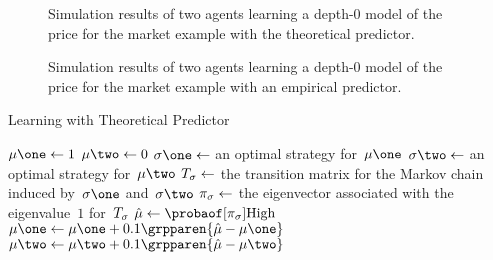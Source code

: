 \newcommand{\figureswidth}{320pt}
\newcommand{\figuresheight}{170pt}

\begin{figure}[htp]
  \centering
  \newcommand{\ylabelsymbol}{\(\mu\Tt\Ii\elmt{\mathrm{High}}\)}%
  \newcommand{\tabledata}{figures/simulation_theoretical.dat}%
  \caption{Simulation results of two agents learning a depth-0 model of the price for the market example with the theoretical predictor.}
  \label{fig:simulation_theoretical}
\end{figure}

\begin{figure}[htp]
  \centering
  \newcommand{\ylabelsymbol}{\(\hat{\mu}\Tt\Ii\elmt{\mathrm{High}}\)}%
  \newcommand{\tabledata}{figures/simulation_empirical.dat}%
  \caption{Simulation results of two agents learning a depth-0 model of the price for the market example with an empirical predictor.}
  \label{fig:simulation_empirical}
\end{figure}

\begin{algorithm}[pht]
  \caption{Learning with Theoretical Predictor}
  \label{alg:theoretical_predictor_learning}
  \begin{algorithmic}
      \State \(\mu\one \gets 1\)
      \State \(\mu\two \gets 0\)
        \State \(\sigma\one \gets\) an optimal strategy for~\(\mu\one\)
        \State \(\sigma\two \gets\) an optimal strategy for~\(\mu\two\)
        \State \(T_{\sigma} \gets\) the transition matrix for the Markov chain induced by~\(\sigma\one\) and~\(\sigma\two\)
        \State \(\pi_{\sigma} \gets\) the eigenvector associated with the eigenvalue~\(1\) for~\(T_{\sigma}\)
        \State \(\hat{\mu} \gets \probaof[\pi\strat{\sigma}]{\mathrm{High}}\)
        \State \(\mu\one \gets \mu\one + 0.1 \grpparen{\hat{\mu} - \mu\one}\)
        \State \(\mu\two \gets \mu\two + 0.1 \grpparen{\hat{\mu} - \mu\two}\)
      \EndFor
    \EndProcedure
  \end{algorithmic}
\end{algorithm}

